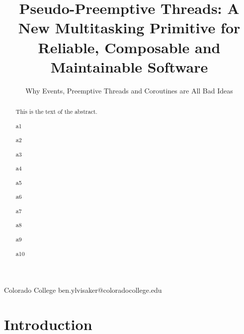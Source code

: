 \documentclass[10pt,preprint]{sigplanconf}
\begin{document}
\newcommand{\charcoal}{Charcoal}

\setlength{\pdfpageheight}{\paperheight}
\setlength{\pdfpagewidth}{\paperwidth}



\title{Pseudo-Preemptive Threads: A New Multitasking Primitive for Reliable, Composable and Maintainable Software}
\subtitle{Why Events, Preemptive Threads and Coroutines are All Bad Ideas\footnotemark}

           {Colorado College}
           {ben.ylvisaker@coloradocollege.edu}

\maketitle

\begin{abstract}
  This is the text of the abstract.

  a1

  a2

  a3

  a4

  a5

  a6

  a7

  a8

  a9

  a10
\end{abstract}





\section{Introduction}
\end{document}
